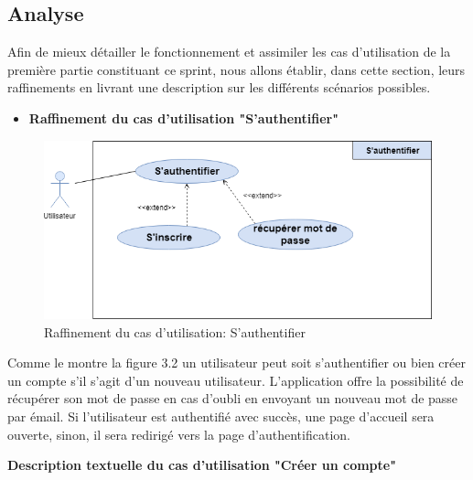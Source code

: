 \subsection{Analyse}
Afin de mieux  détailler le fonctionnement et assimiler les cas d'utilisation de la première partie   constituant  ce sprint, nous allons établir, dans cette section,  leurs raffinements en livrant
une description sur les différents scénarios possibles.
\begin{itemize}
	\item \textbf{Raffinement du cas d'utilisation "S'authentifier"}\\
\end{itemize}

	\begin{figure}[H]
		\centering
		\includegraphics[scale=0.7]{Rauth.png}
		\caption{Raffinement du cas d'utilisation: S'authentifier}
		\label{Raffinement du cas d'utilisation: S'authentifier}
	\end{figure} 
Comme le montre la figure 3.2 un utilisateur peut soit s'authentifier ou bien créer un compte s'il s'agit d'un nouveau
utilisateur. L'application offre la possibilité de récupérer son mot de passe en cas d'oubli
en envoyant un nouveau mot de passe par émail.
Si l'utilisateur est authentifié avec succès, une page d'accueil sera ouverte, sinon, il sera
redirigé vers la page d'authentification.

 \textbf{Description textuelle du cas d'utilisation "Créer un compte"}


